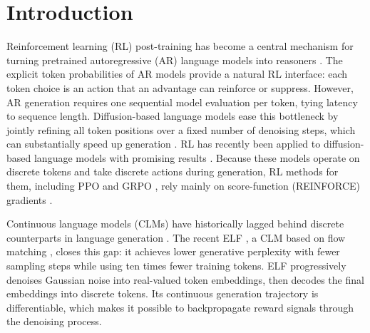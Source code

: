 \section{Introduction}
\label{sec:intro}
Reinforcement learning (RL) post-training has become a central mechanism for turning pretrained autoregressive (AR) language 
models into reasoners \citep{ouyang2022instructgpt,shao2024deepseekmath,deepseek2025r1}. The explicit token probabilities of AR models
provide a natural RL interface: each token choice is an action that an advantage can reinforce or suppress.
However, AR generation requires one sequential model evaluation per token, tying latency to sequence length. Diffusion-based
language models ease this bottleneck by jointly refining all token positions over a fixed number of denoising steps,
which can substantially speed up generation \citep{nie2025llada,sahoo2024mdlm,lou2023sedd}.
RL has recently been applied to diffusion-based language models
with promising results \citep{zhao2025d1,zhu2025llada15,shao2026papo}. Because these models operate on
discrete tokens and take discrete actions during generation, RL methods for them, including PPO \citep{schulman2017ppo}
and GRPO \citep{shao2024deepseekmath}, rely mainly on score-function (REINFORCE) gradients \citep{williams1992reinforce}.


Continuous language models (CLMs) have historically lagged behind discrete counterparts in language generation 
\citep{li2022diffusionlm,gong2022diffuseq,dieleman2022continuous}. The recent ELF \citep{hu2026elf}, a CLM based on
flow matching \citep{lipman2022flow,liu2022rectified}, closes this gap: it achieves lower generative perplexity with fewer
sampling steps while using ten times fewer training tokens. ELF progressively denoises Gaussian noise into real-valued token embeddings, then decodes the final embeddings into discrete tokens. Its continuous generation trajectory is
differentiable, which makes it possible to backpropagate reward signals through the denoising process.


